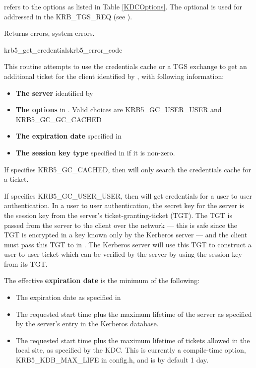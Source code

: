  refers to the options as listed in Table
\ref{KDCOptions}. The optional  is used for addressed
in the KRB_TGS_REQ (see ).

Returns errors, system errors.


\begin{funcdecl}{krb5_get_credentials}{krb5_error_code}{\funcinout}
\funcin
{}
\funcout
{}
\end{funcdecl}

This routine attempts to use the credentials cache  or a TGS
exchange to get an additional ticket for the client identified by
, with following information: 
\begin{itemize}
\item {\bf The server} identified by  
\item {\bf The options} in .
Valid choices are KRB5_GC_USER_USER and KRB5_GC_GC_CACHED
\item {\bf The expiration date} specified in
\item {\bf The session key type} specified in
 if it is non-zero.
\end{itemize}

If  specifies KRB5_GC_CACHED,
then  will only search the credentials cache
for a ticket.  

If  specifies KRB5_GC_USER_USER, then
 will get credentials for a user to user
authentication.  In a user to user authentication, the secret key for
the server 
is the session key from the server's ticket-granting-ticket
(TGT).  The TGT is passed from the server to the client over the
network --- this is safe since the TGT is encrypted in a key
known only by the Kerberos server --- and the client must pass
this TGT to  in
.  The Kerberos server will use
this TGT to construct a user to user ticket which can be verified by
the server by using the session key from its TGT.

The effective {\bf expiration date} is the minimum of the following:
\begin{itemize}
\item The expiration date as specified in
\item The requested start time plus the maximum lifetime of the
server as specified by the server's entry in the
Kerberos database.
\item The requested start time plus the maximum lifetime of tickets
allowed in the local site, as specified by the KDC.
This is currently a compile-time option,
KRB5_KDB_MAX_LIFE in config.h, and is by default 1 day.
\end{itemize}

